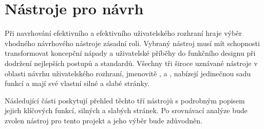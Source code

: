 \section{Nástroje pro návrh}
\label{sec:navrh-ui-nastroje}
Při navrhování efektivního a efektivního uživatelského rozhraní hraje výběr vhodného návrhového nástroje zásadní roli.
Vybraný nástroj musí mít schopnosti transformovat koncepční nápady a uživatelské příběhy do funkčního designu při dodržení nejlepších postupů a standardů.
Všechny tři široce uznávané nástroje v oblasti návrhu uživatelského rozhraní, jmenovitě ,  a , nabízejí jedinečnou sadu funkcí a mají své vlastní silné a slabé stránky\cite{w_how_to_20_best_ui_design_tools}.

Následující části poskytují přehled těchto tří nástrojů s podrobným popisem jejich klíčových funkcí, silných a slabých stránek.
Po srovnávací analýze bude zvolen nástroj pro tento projekt a jeho výběr bude zdůvodněn.

